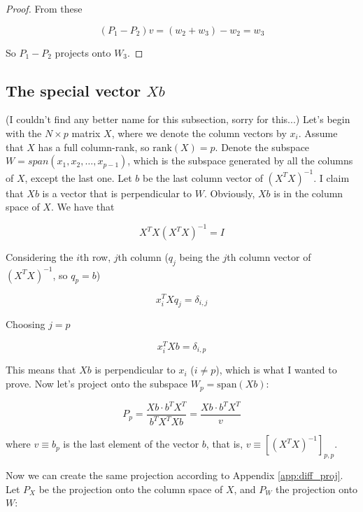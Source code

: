 \documentclass{article}
\begin{document}
\begin{appendices}
\begin{proof}
From these

\begin{equation}
    (P_1 - P_2) v = (w_2 + w_3) - w_2 = w_3
\end{equation}

So $P_1 - P_2$ projects onto $W_3$.

\end{proof}

\subsection{The special vector $Xb$} \label{app:spec_Xb}

(I couldn't find any better name for this subsection, sorry for this...) Let's begin with the $N\times p$ matrix $X$, where we denote the column vectors by $x_i$. Assume that $X$ has a full column-rank, so $\text{rank}(X)=p$. Denote the subspace $W = span(x_1, x_2, \dots, x_{p-1})$, which is the subspace generated by all the columns of $X$, except the last one. Let $b$ be the last column vector of $(X^TX)^{-1}$. I claim that $Xb$ is a vector that is perpendicular to $W$. Obviously, $Xb$ is in the column space of $X$. We have that

\begin{equation}
    X^TX(X^TX)^{-1} = I
\end{equation}

Considering the $i$th row, $j$th column ($q_j$ being the $j$th column vector of $(X^TX)^{-1}$, so $q_p = b$)

\begin{equation}
    x^T_i X q_j = \delta_{i,j}
\end{equation}

Choosing $j=p$

\begin{equation}
    x^T_i X b = \delta_{i,p}
\end{equation}

This means that $Xb$ is perpendicular to $x_i$ ($i \neq p$), which is what I wanted to prove. Now let's project onto the subspace $W_p = \text{span}(Xb)$:

\begin{equation}
    P_{p} = \frac{Xb\cdot b^TX^T}{b^TX^TXb} = \frac{Xb\cdot b^TX^T}{v}
\end{equation}

where $v \equiv b_p$ is the last element of the vector $b$, that is, $v\equiv [(X^TX)^{-1}]_{p,p}$.

Now we can create the same projection according to Appendix \ref{app:diff_proj}. Let $P_X$ be the projection onto the column space of $X$, and $P_W$ the projection onto $W$:


\end{appendices}
\end{document}
